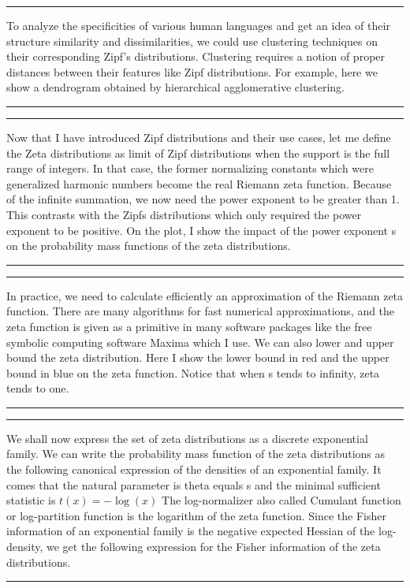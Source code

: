 \documentclass{article}
\def\slide#1{
\noindent\hrule
\begin{center}
\begin{minipage}{0.8\textwidth}
#1
\end{minipage}
\end{center}
\noindent\hrule
}
\begin{document}
\slide{To analyze the specificities of various human languages and get an idea of their structure similarity and dissimilarities, we could use clustering techniques on their corresponding Zipf’s distributions.
Clustering  requires a notion of proper distances between their features like Zipf distributions.
 For example, here we show a dendrogram obtained by hierarchical agglomerative clustering.
}


\slide{Now that I have introduced Zipf distributions and their use cases, let me define the Zeta distributions as limit of Zipf distributions when the support is the full range of integers.
In that case, the former normalizing constants which were generalized harmonic numbers become the real Riemann zeta function.
Because of the infinite summation, we now need the power exponent to be greater than 1. This contrasts with the Zipfs distributions which only required the power exponent to be positive.
On the plot, I show the impact of the power exponent s on the probability mass functions of the zeta distributions.
}


\slide{In practice, we need to calculate efficiently an approximation of the Riemann zeta function. There are many algorithms for fast numerical approximations, and the zeta function is given as a primitive in many software packages like the free symbolic computing software Maxima which I use.
We can also lower and upper bound the zeta distribution.
Here I show the lower bound in red and the upper bound in blue on the zeta function. 
Notice that when s tends to infinity, zeta tends to one.}












\slide{We shall now express the set of zeta distributions as a discrete exponential family.
We can write the probability mass function of the zeta distributions as the following canonical expression of  the densities of an exponential family.
It comes that the natural parameter is theta equals s and the minimal sufficient statistic is $t(x)=-\log(x)$
The log-normalizer also called Cumulant function or log-partition function is the logarithm of the zeta function.
Since the Fisher information of an exponential family is the negative expected Hessian of the log-density, we get the following expression for the Fisher information of the zeta distributions.
}
\end{document}
